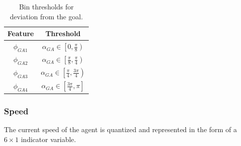 \begin{table}[!htbp]
    \begin{center}
        \renewcommand{\arraystretch}{1.3}
        \begin{tabular}{|c|c|}
            \hline
            \textbf{Feature} & \textbf{Threshold} \\
            \hline
            $\phi_{GA1}$ & $\alpha_{GA} \in \left[ 0 , \frac{\pi}{8} \right)$ \\
            
            $\phi_{GA2}$ & $\alpha_{GA} \in \left[ \frac{\pi}{8} , \frac{\pi}{4} \right)$ \\
            
            $\phi_{GA3}$ & $\alpha_{GA} \in \left[ \frac{\pi}{4} , \frac{3\pi}{4} \right)$ \\
            
            $\phi_{GA4}$ & $\alpha_{GA} \in \left[ \frac{3\pi}{4} , \pi \right]$ \\
            \hline
        \end{tabular}
        \caption{Bin thresholds for deviation from the goal.}
          \label{tab:deviation-from-goal-bins}
    \end{center}
\end{table}

\subsubsection*{Speed}
The current speed of the agent is quantized and represented in the form of a $6 \times 1$ indicator variable. 


